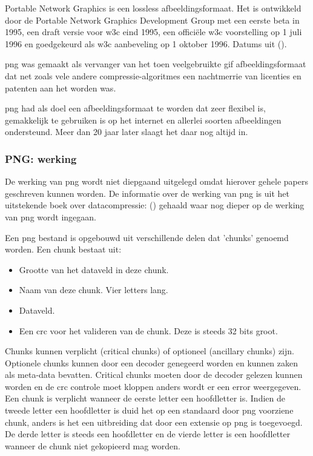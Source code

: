 Portable Network Graphics is een \gls{lossless} \gls{afbeeldingsformaat}. Het is ontwikkeld door de Portable Network Graphics Development Group met een eerste beta in 1995, een draft versie voor \gls{w3c} eind 1995, een officiële \gls{w3c} voorstelling op 1 juli 1996 en goedgekeurd als \gls{w3c} aanbeveling op 1 oktober 1996. Datums uit  (\cite{pnghistory}).

\Gls{png} was gemaakt als vervanger van het toen veelgebruikte \gls{gif} \gls{afbeeldingsformaat} dat net zoals vele andere \glspl{compressie-algoritme} een nachtmerrie van licenties en patenten aan het worden was. 

\Gls{png} had als doel een \gls{afbeeldingsformaat} te worden dat zeer flexibel is, gemakkelijk te gebruiken is op het internet en allerlei soorten afbeeldingen ondersteund. Meer dan 20 jaar later slaagt het daar nog altijd in.

\subsubsection{PNG: werking}
\label{sec:afbeeldingscompressie-png-werking}

De werking van \gls{png} wordt niet diepgaand uitgelegd omdat hierover gehele papers geschreven kunnen worden. De informatie over de werking van \gls{png} is uit het uitstekende boek over \gls{datacompressie}:  (\cite{Salomon2006}) gehaald waar nog dieper op de werking van \gls{png} wordt ingegaan.

Een \gls{png} bestand is opgebouwd uit verschillende delen dat 'chunks' genoemd worden. Een chunk bestaat uit:

\begin{itemize}
	
	\item Grootte van het dataveld in deze chunk.
	
	\item Naam van deze chunk. Vier letters lang.
	
	\item Dataveld.
	
	\item Een \gls{crc} voor het valideren van de chunk. Deze is steeds 32 \glspl{bit} groot.
	
\end{itemize}

Chunks kunnen verplicht (critical chunks) of optioneel (ancillary chunks) zijn. Optionele chunks kunnen door een \gls{decoder} genegeerd worden en kunnen zaken als \gls{meta-data} bevatten. Critical chunks moeten door de \gls{decoder} gelezen kunnen worden en de \gls{crc} controle moet kloppen anders wordt er een error weergegeven. Een chunk is verplicht wanneer de eerste letter een hoofdletter is. Indien de tweede letter een hoofdletter is duid het op een standaard door \gls{png} voorziene chunk, anders is het een uitbreiding dat door een extensie op \gls{png} is toegevoegd. De derde letter is steeds een hoofdletter en de vierde letter is een hoofdletter wanneer de chunk niet gekopieerd mag worden. 

